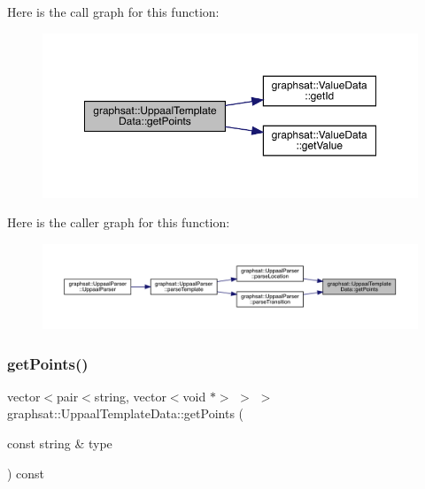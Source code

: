 Here is the call graph for this function\+:
\nopagebreak
\begin{figure}[H]
\begin{center}
\leavevmode
\includegraphics[width=350pt]{classgraphsat_1_1_uppaal_template_data_a2292204622aa329e9e65aafb7f628f3c_cgraph}
\end{center}
\end{figure}
Here is the caller graph for this function\+:
\nopagebreak
\begin{figure}[H]
\begin{center}
\leavevmode
\includegraphics[width=350pt]{classgraphsat_1_1_uppaal_template_data_a2292204622aa329e9e65aafb7f628f3c_icgraph}
\end{center}
\end{figure}
\mbox{\label{classgraphsat_1_1_uppaal_template_data_a76289e5eff0365afcb4b108c9e3af34f}} 
\subsubsection{\texorpdfstring{getPoints()}{getPoints()}\hspace{0.1cm}{\footnotesize\ttfamily [2/2]}}
{\footnotesize\ttfamily vector$<$pair$<$string, vector$<$void $\ast$$>$ $>$ $>$ graphsat\+::\+Uppaal\+Template\+Data\+::get\+Points (\begin{DoxyParamCaption}\item[{const string \&}]{type }\end{DoxyParamCaption}) const\hspace{0.3cm}{\ttfamily [inline]}}

